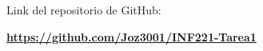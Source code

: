 Link del repositorio de GitHub:

\begin{mdframed}
    \textbf{\url{https://github.com/Joz3001/INF221-Tarea1}}
\end{mdframed}

